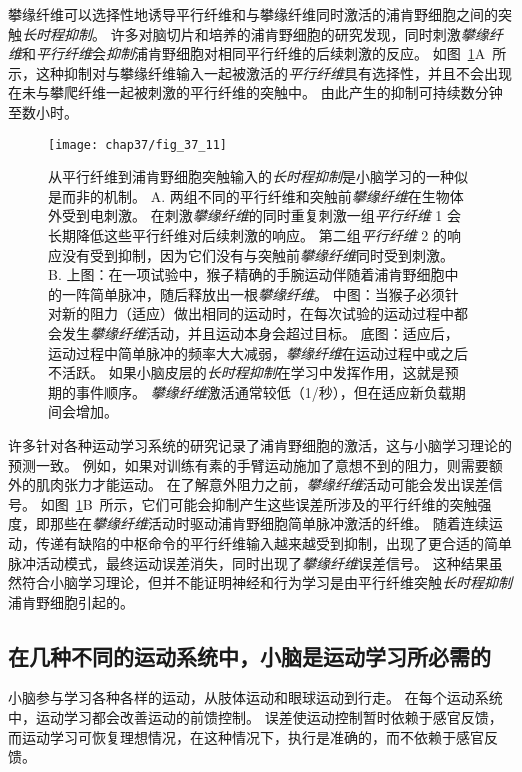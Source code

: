 攀缘纤维可以选择性地诱导平行纤维和与攀缘纤维同时激活的浦肯野细胞之间的突触\textit{长时程抑制}。
许多对脑切片和培养的浦肯野细胞的研究发现，同时刺激\textit{攀缘纤维}和\textit{平行纤维}会\textit{抑制}浦肯野细胞对相同平行纤维的后续刺激的反应。
如图~\ref{fig:37_11}A~所示，这种抑制对与攀缘纤维输入一起被激活的\textit{平行纤维}具有选择性，并且不会出现在未与攀爬纤维一起被刺激的平行纤维的突触中。
由此产生的抑制可持续数分钟至数小时。


\begin{figure}[htbp]
	\centering
	\texttt{[image: chap37/fig\_37\_11]}
	\caption{从平行纤维到浦肯野细胞突触输入的\textit{长时程抑制}是小脑学习的一种似是而非的机制。
		A. 两组不同的平行纤维和突触前\textit{攀缘纤维}在生物体外受到电刺激。
		在刺激\textit{攀缘纤维}的同时重复刺激一组\textit{平行纤维} 1 会长期降低这些平行纤维对后续刺激的响应。
		第二组\textit{平行纤维} 2 的响应没有受到抑制，因为它们没有与突触前\textit{攀缘纤维}同时受到刺激\cite{ito1982climbing}。
		B. 上图：在一项试验中，猴子精确的手腕运动伴随着浦肯野细胞中的一阵简单脉冲，随后释放出一根\textit{攀缘纤维}。
		中图：当猴子必须针对新的阻力（适应）做出相同的运动时，在每次试验的运动过程中都会发生\textit{攀缘纤维}活动，并且运动本身会超过目标。
		底图：适应后，运动过程中简单脉冲的频率大大减弱，\textit{攀缘纤维}在运动过程中或之后不活跃。
		如果小脑皮层的\textit{长时程抑制}在学习中发挥作用，这就是预期的事件顺序。
		\textit{攀缘纤维}激活通常较低（1/秒），但在适应新负载期间会增加\cite{gilbert1977purkinje}。}
	\label{fig:37_11}
\end{figure}


许多针对各种运动学习系统的研究记录了浦肯野细胞的激活，这与小脑学习理论的预测一致。
例如，如果对训练有素的手臂运动施加了意想不到的阻力，则需要额外的肌肉张力才能运动。
在了解意外阻力之前，\textit{攀缘纤维}活动可能会发出误差信号。
如图~\ref{fig:37_11}B~所示，它们可能会抑制产生这些误差所涉及的平行纤维的突触强度，即那些在\textit{攀缘纤维}活动时驱动浦肯野细胞简单脉冲激活的纤维。
随着连续运动，传递有缺陷的中枢命令的平行纤维输入越来越受到抑制，出现了更合适的简单脉冲活动模式，最终运动误差消失，同时出现了\textit{攀缘纤维}误差信号。
这种结果虽然符合小脑学习理论，但并不能证明神经和行为学习是由平行纤维突触\textit{长时程抑制}浦肯野细胞引起的。



\subsection{在几种不同的运动系统中，小脑是运动学习所必需的}

小脑参与学习各种各样的运动，从肢体运动和眼球运动到行走。
在每个运动系统中，运动学习都会改善运动的前馈控制。
误差使运动控制暂时依赖于感官反馈，而运动学习可恢复理想情况，在这种情况下，执行是准确的，而不依赖于感官反馈。


